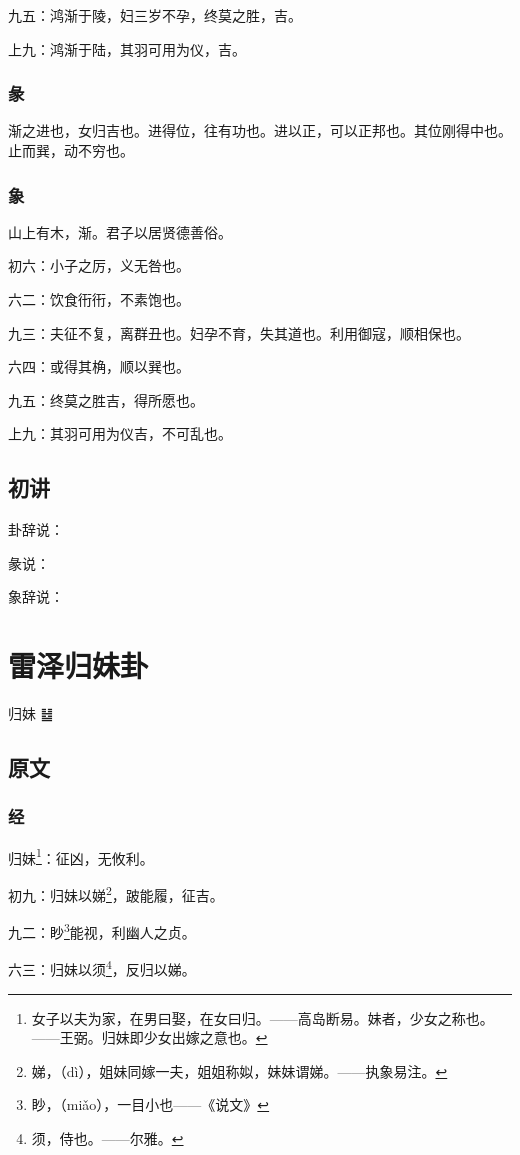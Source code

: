 \documentclass[12pt,oneside]{book}
\begin{document}
九五：鸿渐于陵，妇三岁不孕，终莫之胜，吉。

上九：鸿渐于陆，其羽可用为仪，吉。

\subsection{彖}
渐之进也，女归吉也。进得位，往有功也。进以正，可以正邦也。其位刚得中也。止而巽，动不穷也。

\subsection{象}
山上有木，渐。君子以居贤德善俗。

初六：小子之厉，义无咎也。

六二：饮食衎衎，不素饱也。

九三：夫征不复，离群丑也。妇孕不育，失其道也。利用御寇，顺相保也。

六四：或得其桷，顺以巽也。

九五：终莫之胜吉，得所愿也。

上九：其羽可用为仪吉，不可乱也。


\section{初讲}
卦辞说：

彖说：

象辞说：

\chapter{雷泽归妹卦}
归妹 {\Large ䷵}


\section{原文}

\subsection{经}
归妹\footnote{女子以夫为家，在男曰娶，在女曰归。——高岛断易。妹者，少女之称也。——王弼。归妹即少女出嫁之意也。}：征凶，无攸利。

初九：归妹以娣\footnote{娣，（dì），姐妹同嫁一夫，姐姐称姒，妹妹谓娣。——执象易注。}，跛能履，征吉。

九二：眇\footnote{眇，（miǎo），一目小也——《说文》}能视，利幽人之贞。

六三：归妹以须\footnote{须，侍也。——尔雅。}，反归以娣。
\end{document}
